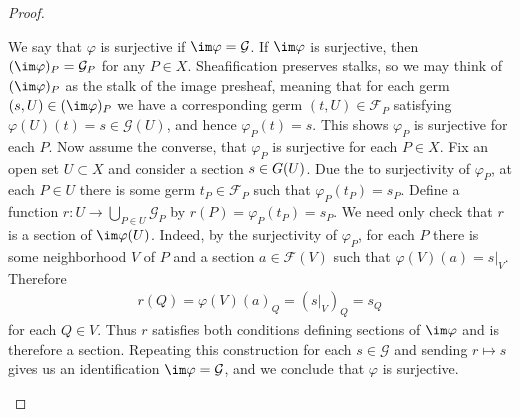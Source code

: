 \begin{problemset}
\begin{proof}
\begin{enumerate}[(a)]
			\bigskip

			We say that $\varphi$ is surjective if $\im\varphi = \mathcal G$. If $\im \varphi$ is surjective, then $(\im\varphi)_P = \mathcal G_P$ for any $P\in X$. Sheafification preserves stalks, so we may think of $(\im\varphi)_P$ as the stalk of the image presheaf, meaning that for each germ $(s,U) \in (\im\varphi)_P$ we have a corresponding germ $(t,U)\in \mathcal F_P$ satisfying $\varphi(U)(t) = s\in \mathcal G(U)$, and hence $\varphi_P(t) = s$. This shows $\varphi_P$ is surjective for each $P$. Now assume the converse, \ie that $\varphi_P$ is surjective for each $P\in X$. Fix an open set $U\subset X$ and consider a section $s\in \mathcal \mathcal G(U)$. Due the to surjectivity of $\varphi_P$, at each $P \in U$ there is some germ $t_P \in \mathcal F_P$ such that $\varphi_P(t_P) = s_P$. Define a function $r:U\to \bigcup_{P\in U}\mathcal G_P$ by $r(P) = \varphi_P(t_P) = s_P$. We need only check that $r$ is a section of $\im\varphi(U)$. Indeed, by the surjectivity of $\varphi_P$, for each $P$ there is some neighborhood $V$ of $P$ and a section $a \in \mathcal F(V)$ such that $\varphi(V)(a) = s|_V$. Therefore
			\begin{align*}
				r(Q) = \varphi(V)(a)_Q = (s|_V)_Q = s_Q
			\end{align*}
			for each $Q \in V$. Thus $r$ satisfies both conditions defining sections of $\im\varphi$ and is therefore a section. Repeating this construction for each $s\in \mathcal G$ and sending $r\mapsto s$ gives us an identification $\im\varphi = \mathcal G$, and we conclude that $\varphi$ is surjective.


\end{enumerate}
\end{proof}
\end{problemset}
